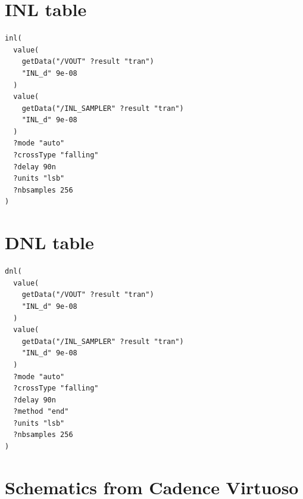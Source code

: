 \documentclass[english, 12pt, a4paper]{ifimaster}
\begin{document}
\printbibliography{}

\begin{appendices}


\chapter{INL table}

\begin{lstlisting}[frame=single]
inl(
  value(
    getData("/VOUT" ?result "tran") 
    "INL_d" 9e-08
  ) 
  value(
    getData("/INL_SAMPLER" ?result "tran") 
    "INL_d" 9e-08
  )  
  ?mode "auto"
  ?crossType "falling" 
  ?delay 90n 
  ?units "lsb" 
  ?nbsamples 256
)
\end{lstlisting}




\chapter{DNL table}
\begin{lstlisting}[frame=single]
dnl(
  value(
    getData("/VOUT" ?result "tran") 
    "INL_d" 9e-08
  ) 
  value(
    getData("/INL_SAMPLER" ?result "tran") 
    "INL_d" 9e-08
  ) 
  ?mode "auto"  
  ?crossType "falling" 
  ?delay 90n 
  ?method "end" 
  ?units "lsb" 
  ?nbsamples 256
)
\end{lstlisting}



% 
\chapter{Schematics from Cadence Virtuoso}
\newpage

\end{appendices}
\end{document}

